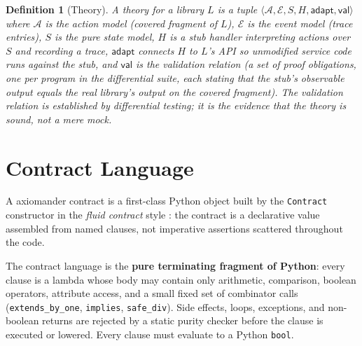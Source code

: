 \documentclass[11pt,a4paper]{article}
\newtheorem{definition}{Definition}
\begin{document}
\begin{definition}[Theory]
A \emph{theory} for a library $L$ is a tuple
$\langle \mathcal{A}, \mathcal{E}, S, H, \mathsf{adapt},
\mathsf{val} \rangle$ where $\mathcal{A}$ is the action model
(covered fragment of $L$), $\mathcal{E}$ is the event model (trace
entries), $S$ is the pure state model, $H$ is a stub handler
interpreting actions over $S$ and recording a trace,
$\mathsf{adapt}$ connects $H$ to $L$'s API so unmodified service code
runs against the stub, and $\mathsf{val}$ is the \emph{validation
relation} (a set of proof obligations, one per program in the
differential suite, each stating that the stub's observable output
equals the real library's output on the covered fragment).  The
validation relation is established by differential testing; it is
the evidence that the theory is sound, not a mere mock.
\end{definition}

\section{Contract Language}\label{sec:language}

A \textsf{axiomander} contract is a first-class Python object built by
the \texttt{Contract} constructor in the \emph{fluid contract} style
\cite{Meyer92,Leino10}: the contract is a declarative value assembled
from named clauses, not imperative assertions scattered throughout the
code.

The contract language is the \textbf{pure terminating fragment of
Python}: every clause is a lambda whose body may contain only
arithmetic, comparison, boolean operators, attribute access, and a
small fixed set of combinator calls (\texttt{extends\_by\_one},
\texttt{implies}, \texttt{safe\_div}).  Side effects, loops,
exceptions, and non-boolean returns are rejected by a static purity
checker before the clause is executed or lowered.  Every clause must
evaluate to a Python \texttt{bool}.
\end{document}

